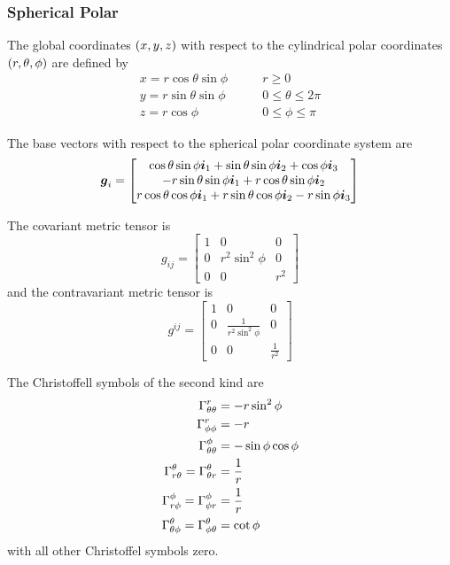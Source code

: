 \subsubsection{Spherical Polar}

The global coordinates $\left( x,y,z \right)$ with respect to the cylindrical polar
coordinates $\left( r,\theta,\phi \right)$ are defined by
\begin{equation}
  \begin{aligned}
    x = r\cos\theta\sin\phi & \qquad r \ge 0 \\
    y = r\sin\theta\sin\phi & \qquad 0 \le \theta \le 2\pi \\
    z = r\cos\phi & \qquad 0 \le \phi \le \pi
  \end{aligned}
\end{equation}

The base vectors with respect to the spherical polar coordinate system are
\begin{equation}
  \boldsymbol{g}_{i}=\begin{bmatrix} 
    \cos\theta\sin\phi\boldsymbol{i}_{1}+\sin\theta\sin\phi\boldsymbol{i}_{2}+\cos\phi\boldsymbol{i}_{3} \\ 
    -r\sin\theta\sin\phi\boldsymbol{i}_{1}+r\cos\theta\sin\phi\boldsymbol{i}_{2} \\
    r\cos\theta\cos\phi\boldsymbol{i}_{1}+r\sin\theta\cos\phi\boldsymbol{i}_{2}-r\sin\phi\boldsymbol{i}_{3}
  \end{bmatrix}
\end{equation}

The covariant metric tensor is
\begin{equation}
  g_{ij}=\begin{bmatrix}
    1 & 0 & 0 \\
    0 & r^{2}\sin^{2}\phi & 0 \\
    0 & 0 & r^{2} 
  \end{bmatrix}
\end{equation}
and the contravariant metric tensor is
\begin{equation}
  g^{ij}=\begin{bmatrix}
    1 & 0 & 0 \\
    0 &  \frac{1}{r^{2}\sin^{2}\phi} & 0 \\
    0 & 0 & \frac{1}{r^{2}} 
  \end{bmatrix}
\end{equation}

The Christoffell symbols of the second kind are
\begin{align}
   \Gamma^{r}_{\theta\theta} &=-r\sin^{2}\phi \\
   \Gamma^{r}_{\phi\phi} &=-r \\
   \Gamma^{\phi}_{\theta\theta} &=-\sin\phi\cos\phi \\
   \Gamma^{\theta}_{r\theta} = \Gamma^{\theta}_{\theta r} &=\frac{1}{r} \\
   \Gamma^{\phi}_{r\phi} = \Gamma^{\phi}_{\phi r} &=\frac{1}{r} \\
   \Gamma^{\theta}_{\theta\phi} = \Gamma^{\theta}_{\phi\theta} &=\cot\phi
\end{align}
with all other Christoffel symbols zero.


